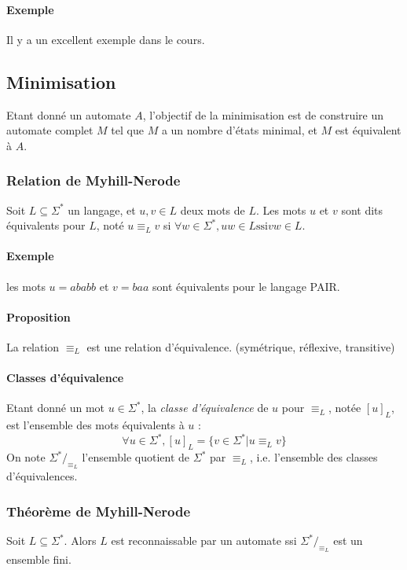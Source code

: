 \documentclass[a4paper]{article}
\begin{document}
  \paragraph{Exemple} Il y a un excellent exemple dans le cours.


  \subsection{Minimisation}
  Etant donné un automate $A$, l'objectif de la minimisation est de 
construire un automate
  complet $M$ tel que $M$ a un nombre d'états minimal, et $M$ est 
équivalent à $A$.

  \subsubsection{Relation de Myhill-Nerode}
  Soit $L \subseteq \Sigma^*$ un langage, et $u,v\in L$ deux mots de 
$L$.
  Les mots $u$ et $v$ sont dits équivalents pour $L$, noté $u \equiv_L 
v$ si
  $ \forall w \in \Sigma^*, uw \in L \text{ssi} vw \in L$.

  \paragraph{Exemple} les mots $u=ababb$ et $v=baa$ sont équivalents 
pour le 
  langage PAIR.

  \paragraph{Proposition} La relation $\equiv_L$ est une relation 
d'équivalence. 
  (symétrique, réflexive, transitive)

  \paragraph{Classes d'équivalence}
  Etant donné un mot $u \in \Sigma^*$, la \textit{classe d'équivalence} 
de $u$ pour
  $\equiv_L$, notée $[u]_L$, est l'ensemble des mots équivalents à $u$ :
  $$ \forall u \in \Sigma^*, [u]_L = \{v \in \Sigma^* | u \equiv_L v\}$$
  On note $\Sigma^*/_{\equiv_L}$ l'ensemble quotient de $\Sigma^*$ par 
$\equiv_L$, 
  i.e. l'ensemble des classes d'équivalences.

  \subsubsection{Théorème de Myhill-Nerode}
  Soit $L \subseteq \Sigma^*$. Alors $L$ est reconnaissable par un 
automate 
  ssi $\Sigma^*/_{\equiv_L}$ est un ensemble fini.
  
\end{document}
